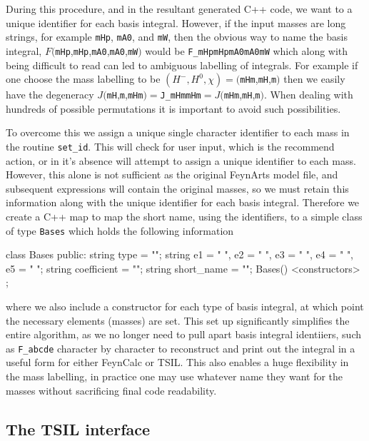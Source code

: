 During this procedure, and in the resultant generated C++ code, we want to a unique identifier for each basis integral.  However, if the input masses are long strings, for example \lstinline{mHp}, \lstinline{mA0}, and \lstinline{mW}, then the obvious way to name the basis integral, $F($\lstinline{mHp},\lstinline{mHp},\lstinline{mA0},\lstinline{mA0},\lstinline{mW}$)$ would be \lstinline{F_mHpmHpmA0mA0mW} which along with being difficult to read can led to ambiguous labelling of integrals.  For example if one choose the mass labelling to be $(H^-, H^0, \chi ) = ($\lstinline{mHm},\lstinline{mH},\lstinline{m}$)$ then we easily have the degeneracy $J($\lstinline{mH},\lstinline{m},\lstinline{mHm}$) =  $\lstinline{J_mHmmHm}$ = J($\lstinline{mHm},\lstinline{mH},\lstinline{m}$)$.  When dealing with hundreds of possible permutations it is important to avoid such possibilities.

To overcome this we assign a unique single character identifier to each mass in the routine \lstinline{set_id}.  This will check for user input, which is the recommend action, or in it's absence will attempt to assign a unique identifier to each mass.  However, this alone is not sufficient as the original FeynArts model file, and subsequent expressions will contain the original masses, so we must retain this information along with the unique identifier for each basis integral.  Therefore we create a C++ map to map the short name, using the identifiers, to a simple class of type \lstinline{Bases} which holds the following information
\begin{lstcpp}
class Bases
{
public:
string type = "";
string e1 = " ", e2 = " ", e3 = " ", e4 = " ", e5 = " ";
string coefficient = "";
string short_name = "";
Bases() {}
<constructors>
};
\end{lstcpp}
where we also include a constructor for each type of basis integral, at which point the necessary elements (masses) are set.  This set up significantly simplifies the entire algorithm, as we no longer need to pull apart basis integral identiiers, such as \lstinline{F_abcde} character by character to reconstruct and print out the integral in a useful form for either FeynCalc or TSIL.  This also enables a huge flexibility in the mass labelling, in practice one may use whatever name they want for the masses without sacrificing final code readability.



\subsection{The TSIL interface}

